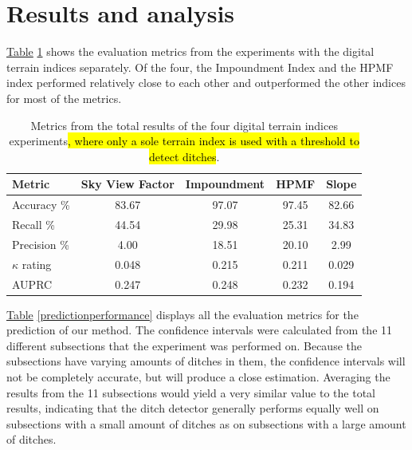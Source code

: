 \documentclass[11pt, review]{elsarticle} %
\begin{document}
\section{Results and analysis}

\hyperref[recreatedpredictionperformance]{Table} \ref{recreatedpredictionperformance} shows the evaluation metrics from the experiments with the digital terrain indices separately. Of the four, the Impoundment Index and the HPMF index performed relatively close to each other and outperformed the other indices for most of the metrics.

\begin{table}[!htb]
\centering
    {\begin{tabular}{l|cccc}
        \textbf{Metric} & \textbf{Sky View Factor} & \textbf{Impoundment} & \textbf{HPMF} & \textbf{Slope}\\
        \hline
        Accuracy \%     & 83.67 & 97.07 & 97.45 & 82.66 \\
        Recall \%       & 44.54 & 29.98 & 25.31 & 34.83 \\
        Precision \%    &{ 4.00}  & 18.51 & 20.10 & { 2.99} \\
        $\kappa$ rating & 0.048 & 0.215 & 0.211 & 0.029 \\
        AUPRC & 0.247 & 0.248 & 0.232 & 0.194 \\
        \hline
    \end{tabular}}
    \caption{Metrics from the total results of the four digital terrain indices experiments\hl{, where only a sole terrain index is used with a threshold to detect ditches}.}
    \label{recreatedpredictionperformance}
\end{table}

\hyperref[predictionperformance]{Table} \ref{predictionperformance} displays all the evaluation metrics for the prediction of our method. The confidence intervals were calculated from the 11 different subsections that the experiment was performed on. Because the subsections have varying amounts of ditches in them, the confidence intervals will not be completely accurate, but will produce a close estimation. Averaging the results from the 11 subsections would yield a very similar value to the total results, indicating that the ditch detector generally performs equally well on subsections with a small amount of ditches as on subsections with a large amount of ditches.
\end{document}
